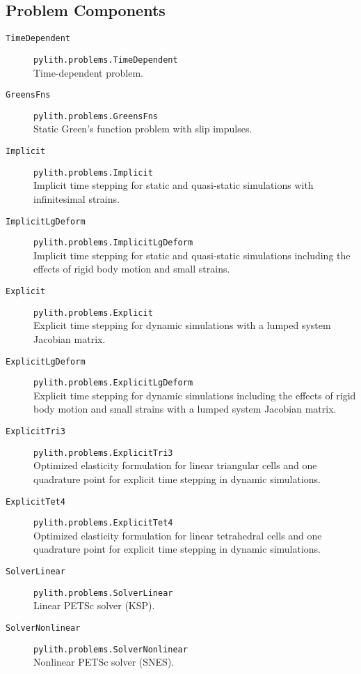 \subsection{Problem Components}
\begin{description}
\item [{\texttt{TimeDependent}}] \texttt{pylith.problems.TimeDependent}\\
Time-dependent problem.
\item [{\texttt{GreensFns}}] \texttt{pylith.problems.GreensFns}\\
Static Green's function problem with slip impulses.
\item [{\texttt{Implicit}}] \texttt{pylith.problems.Implicit}\\
Implicit time stepping for static and quasi-static simulations with
infinitesimal strains.
\item [{\texttt{ImplicitLgDeform}}] \texttt{pylith.problems.ImplicitLgDeform}\\
Implicit time stepping for static and quasi-static simulations including
the effects of rigid body motion and small strains.
\item [{\texttt{Explicit}}] \texttt{pylith.problems.Explicit}\\
Explicit time stepping for dynamic simulations with a lumped system
Jacobian matrix.
\item [{\texttt{ExplicitLgDeform}}] \texttt{pylith.problems.ExplicitLgDeform}\\
Explicit time stepping for dynamic simulations including the effects
of rigid body motion and small strains with a lumped system Jacobian
matrix.
\item [{\texttt{ExplicitTri3}}] \texttt{pylith.problems.ExplicitTri3}\\
Optimized elasticity formulation for linear triangular cells and one
quadrature point for explicit time stepping in dynamic simulations.
\item [{\texttt{ExplicitTet4}}] \texttt{pylith.problems.ExplicitTet4}\\
Optimized elasticity formulation for linear tetrahedral cells and
one quadrature point for explicit time stepping in dynamic simulations.
\item [{\texttt{SolverLinear}}] \texttt{pylith.problems.SolverLinear}\\
Linear PETSc solver (KSP).
\item [{\texttt{SolverNonlinear}}] \texttt{pylith.problems.SolverNonlinear}\\
Nonlinear PETSc solver (SNES).

\end{description}
